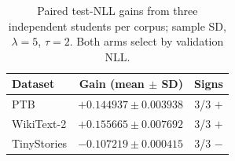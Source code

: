 \begin{table}[t]
\centering
\begin{tabular}{lrr}
\toprule
Dataset & Gain (mean $\pm$ SD) & Signs\\
\midrule
PTB & $+0.144937\pm0.003938$ & 3/3 $+$\\
WikiText-2 & $+0.155665\pm0.007692$ & 3/3 $+$\\
TinyStories & $-0.107219\pm0.000415$ & 3/3 $-$\\
\bottomrule
\end{tabular}
\caption{Paired test-NLL gains from three independent students per corpus; sample SD, $\lambda=5$, $\tau=2$. Both arms select by validation NLL.}
\label{tab:cross_domain_transfer}
\end{table}
